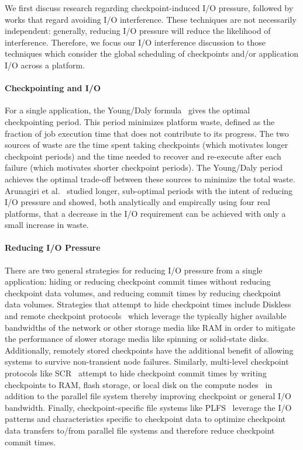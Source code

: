 \documentclass[two]{article}
\begin{document}
We first discuss research regarding checkpoint-induced I/O pressure, followed by
works that regard avoiding I/O interference.  These techniques are not necessarily
independent: generally, reducing I/O pressure will reduce the likelihood of
interference.  Therefore, we focus our I/O interference discussion to those
techniques which consider the global scheduling of checkpoints and/or application I/O
across a platform.


\paragraph*{Checkpointing and I/O}

For a single application, the Young/Daly formula~\cite{young74,daly04} gives the
optimal checkpointing period. This period minimizes platform waste, defined as the
fraction of job execution time that does not contribute to its progress.  The two
sources of waste are the time spent taking checkpoints (which motivates longer
checkpoint periods) and the time needed to recover and re-execute after each failure
(which motivates shorter checkpoint periods). The Young/Daly period achieves the
optimal trade-off between these sources to minimize the total waste. Arunagiri et
al.~\cite{Arunagiri2010} studied longer, sub-optimal periods with the intent of
reducing I/O pressure and showed, both analytically and empircally using four real
platforms, that a decrease in the I/O requirement can be achieved with only a small
increase in waste.

\paragraph*{Reducing I/O Pressure}

There are two general strategies for reducing I/O pressure from a single application:
hiding or reducing checkpoint commit times without reducing checkpoint data volumes,
and reducing commit times by reducing checkpoint data volumes.  Strategies that
attempt to hide checkpoint times include Diskless~\cite{Plank98Diskless} and remote
checkpoint protocols~\cite{Cornwell11RemoteBLCR} which leverage the typically higher
available bandwidths of the network or other storage media like RAM in order to
mitigate the performance of slower storage media like spinning or solid-state
disks. Additionally, remotely stored checkpoints have the additional benefit of
allowing systems to survive non-transient node failures. Similarly, multi-level
checkpoint protocols like SCR~\cite{Moody10SCR,Vaidya95TwoLevel} attempt to hide
checkpoint commit times by writing checkpoints to RAM, flash storage, or local disk
on the compute nodes~\cite{Kougkas2017} in addition to the parallel file system
thereby improving checkpoint or general I/O bandwidth.  Finally, checkpoint-specific
file systems like PLFS~\cite{Bent09PLFS} leverage the I/O patterns and
characteristics specific to checkpoint data to optimize checkpoint data transfers
to/from parallel file systems and therefore reduce checkpoint commit times.
\end{document}
